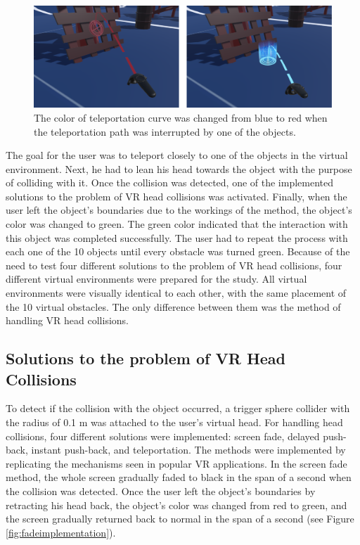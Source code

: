 \begin{figure}[th]
\centering
\includegraphics[width=1\textwidth]{img/implemented_teleportation.png}
\caption{The color of teleportation curve was changed from blue to red when the teleportation path was interrupted by one of the objects.}
\label{fig:tpimplementation}
\end{figure}

The goal for the user was to teleport closely to one of the objects in the virtual environment. Next, he had to lean his head towards the object with the purpose of colliding with it. Once the collision was detected, one of the implemented solutions to the problem of VR head collisions was activated. Finally, when the user left the object's boundaries due to the workings of the method, the object's color was changed to green. The green color indicated that the interaction with this object was completed successfully. The user had to repeat the process with each one of the 10 objects until every obstacle was turned green. Because of the need to test four different solutions to the problem of VR head collisions, four different  virtual environments were prepared for the study. All virtual environments were visually identical to each other, with the same placement of the 10 virtual obstacles. The only difference between them was the method of handling VR head collisions.

\subsection{Solutions to the problem of VR Head Collisions}

To detect if the collision with the object occurred, a trigger sphere collider \cite{SPHERECOLLIDER} with the radius of 0.1 m was attached to the user's virtual head. For handling head collisions, four different solutions were implemented: screen fade, delayed push-back, instant push-back, and teleportation. The methods were implemented by replicating the mechanisms seen in popular VR applications. In the screen fade method, the whole screen gradually faded to black in the span of a second when the collision was detected. Once the user left the object's boundaries by retracting his head back, the object's color was changed from red to green, and the screen gradually returned back to normal in the span of a second (see Figure \ref{fig:fadeimplementation}). 

